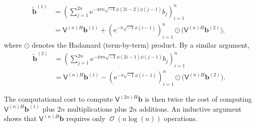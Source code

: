 \documentclass[twocolumn]{svjour3}          %
\DeclareMathOperator{\Order}{{\mathcal O}}
\newcommand{\bm}[1]{\boldsymbol{#1}}
\newcommand{\vb}{\bm{b}}
\newcommand{\mV}{\mathsf{V}}
\newcommand{\me}{\mathrm{e}}
\begin{document}
\begin{align*}
\widetilde{\vb}^{(1)} &= \left( \sum_{j=1}^{2n}  \me^{-4 \pi n \sqrt{-1} \phi(2i-2)\phi(j-1)} b_{j} \right)_{i=1}^n \\
&= \mV^{(n)H}\vb^{(1)} +  \left(  \me^{-\pi \sqrt{-1} \phi(i-1)} \right)_{i=1}^n \odot \bigl(\mV^{(n)H}\vb^{(2)} \bigr),
\end{align*}
where $\odot$ denotes the Hadamard (term-by-term) product.  By a similar argument, 
\begin{align*}
\widetilde{\vb}^{(2)} &= \left( \sum_{j=1}^{2n}  \me^{-4 \pi n \sqrt{-1} \phi(2i-1)\phi(j-1)} b_{j} \right)_{i=1}^n \\
&= \mV^{(n)H}\vb^{(1)} -  \left(  \me^{-\pi \sqrt{-1} \phi(i-1)} \right)_{i=1}^n \odot \bigl(\mV^{(n)H}\vb^{(2)} \bigr).
\end{align*}

The computational cost to compute $\mV^{(2n)H}\vb$ is then twice the cost of computing $\mV^{(n)H}\vb^{(1)}$ plus $2n$ multiplications plus $2n$ additions.  An inductive argument shows that $\mV^{(n)H}\vb$ requires only $\Order(n \log(n))$ operations.
\end{document}
